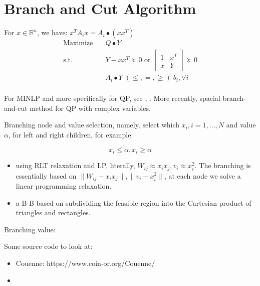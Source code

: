\documentclass[../main]{subfiles}
\begin{document}
\section{Branch and Cut Algorithm}


For \(x \in \mathbb{R}^{n}\), we have: \(x^{T} A_{i} x = A_i \bullet (xx^T)\)
\begin{equation}
    \begin{aligned}
        \mathrm{Maximize}\quad & Q\bullet Y                                                        \\
        \mathrm{s.t.}  \quad   & Y-xx^T \succeq 0 \text { or } \begin{bmatrix} 1 & x^{T} \\ x & Y \end{bmatrix} \succeq 0 \\
                               & A_i \bullet Y \; (\le, =, \ge) \; b_i, \forall i                  \\
    \end{aligned}
\end{equation}

For MINLP and more specifically for QP, see \cite{belotti_mixed-integer_2013}, \cite{misener_glomiqo_2013}. More recently, spacial branch-and-cut method \cite{chen_spatial_2017} for QP with complex variables.


Branching node and value selection, namely, select which \(x_i, i = 1, ..., N\) and value \(\alpha\), for left and right children, for example:

\[x_i \le \alpha, x_i \ge \alpha\]

\begin{itemize}
    \item \cite{audet_branch_2000} using RLT relaxation and LP, literally, \(W_{ij} \approx x_i x_j , v_i \approx x_i^2\). The branching is essentially based on \(\|W_{ij} - x_ix_j\|, \|v_i - x_i^2\|\), at each node we solve a linear programming relaxation.
    \item \cite{linderoth_simplicial_2005} a B-B based on subdividing the feasible region into the Cartesian product of triangles and rectangles.

\end{itemize}
Branching value:


Some source code to look at:

\begin{itemize}
    \item Couenne: https://www.coin-or.org/Couenne/
    \item
\end{itemize}
\end{document}
